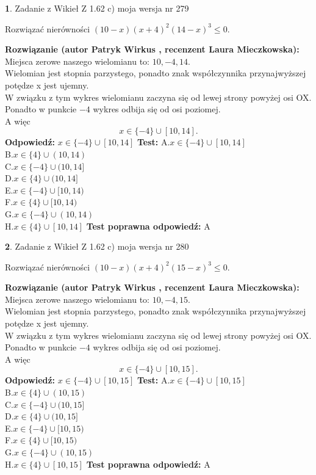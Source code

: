 \documentclass[12pt, a4paper]{article}
\theoremstyle{definition} %
\newtheorem{zad}{}
\newcommand{\zadStart}[1]{\begin{zad}#1\newline}
\newcommand{\zadStop}{\end{zad}}
\newcommand{\rozwStart}[2]{\noindent \textbf{Rozwiązanie (autor #1 , recenzent #2): }\newline}
\newcommand{\rozwStop}{\newline}
\newcommand{\odpStart}{\noindent \textbf{Odpowiedź:}\newline}
\newcommand{\odpStop}{\newline}
\newcommand{\testStart}{\noindent \textbf{Test:}\newline}
\newcommand{\testStop}{\newline}
\newcommand{\kluczStart}{\noindent \textbf{Test poprawna odpowiedź:}\newline}
\newcommand{\kluczStop}{\newline}
\begin{document}
\zadStart{Zadanie z Wikieł Z 1.62 c) moja wersja nr 279}

Rozwiązać nierówności $(10-x)(x+4)^{2}(14-x)^{3}\le0$.
\zadStop
\rozwStart{Patryk Wirkus}{Laura Mieczkowska}
Miejsca zerowe naszego wielomianu to: $10, -4, 14$.\\
Wielomian jest stopnia parzystego, ponadto znak współczynnika przy\linebreak najwyższej potędze x jest ujemny.\\ W związku z tym wykres wielomianu zaczyna się od lewej strony powyżej osi OX.\\
Ponadto w punkcie $-4$ wykres odbija się od osi poziomej.\\
A więc $$x \in \{-4\} \cup [10,14].$$
\rozwStop
\odpStart
$x \in \{-4\} \cup [10,14]$
\odpStop
\testStart
A.$x \in \{-4\} \cup [10,14]$\\
B.$x \in \{4\} \cup (10,14)$\\
C.$x \in \{-4\} \cup (10,14]$\\
D.$x \in \{4\} \cup (10,14]$\\
E.$x \in \{-4\} \cup [10,14)$\\
F.$x \in \{4\} \cup [10,14)$\\
G.$x \in \{-4\} \cup (10,14)$\\
H.$x \in \{4\} \cup [10,14]$
\testStop
\kluczStart
A
\kluczStop



\zadStart{Zadanie z Wikieł Z 1.62 c) moja wersja nr 280}

Rozwiązać nierówności $(10-x)(x+4)^{2}(15-x)^{3}\le0$.
\zadStop
\rozwStart{Patryk Wirkus}{Laura Mieczkowska}
Miejsca zerowe naszego wielomianu to: $10, -4, 15$.\\
Wielomian jest stopnia parzystego, ponadto znak współczynnika przy\linebreak najwyższej potędze x jest ujemny.\\ W związku z tym wykres wielomianu zaczyna się od lewej strony powyżej osi OX.\\
Ponadto w punkcie $-4$ wykres odbija się od osi poziomej.\\
A więc $$x \in \{-4\} \cup [10,15].$$
\rozwStop
\odpStart
$x \in \{-4\} \cup [10,15]$
\odpStop
\testStart
A.$x \in \{-4\} \cup [10,15]$\\
B.$x \in \{4\} \cup (10,15)$\\
C.$x \in \{-4\} \cup (10,15]$\\
D.$x \in \{4\} \cup (10,15]$\\
E.$x \in \{-4\} \cup [10,15)$\\
F.$x \in \{4\} \cup [10,15)$\\
G.$x \in \{-4\} \cup (10,15)$\\
H.$x \in \{4\} \cup [10,15]$
\testStop
\kluczStart
A
\kluczStop
\end{document}
